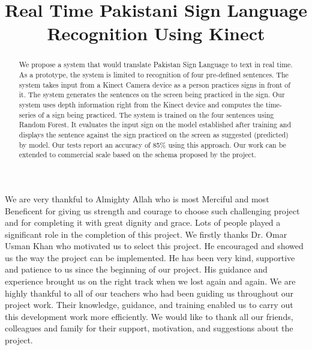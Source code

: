 \documentclass{fast-nuces-bs}
\title{Real Time Pakistani Sign Language
	Recognition Using Kinect}
\begin{document}
\begin{acknowledgements}
	We are very thankful to Almighty Allah who is most Merciful and most Beneficent for
	giving us strength and courage to choose such challenging project and for completing it
	with great dignity and grace. Lots of people played a significant role in the completion of
	this project.
	We firstly thanks Dr. Omar Usman Khan who motivated us to select this project. He
	encouraged and showed us the way the project can be implemented. He has been very
	kind, supportive and patience to us since the beginning of our project. His guidance and
	experience brought us on the right track when we lost again and again.
	We are highly thankful to all of our teachers who had been guiding us throughout our
	project work. Their knowledge, guidance, and training enabled us to carry out this development work more efficiently. We would like to thank all our friends, colleagues and
	family for their support, motivation, and suggestions about the project.
\end{acknowledgements}

\begin{abstract}
We propose a system that would translate Pakistan Sign Language to text in real time.
As a prototype, the system is limited to recognition of four pre-defined sentences. The system takes
input from a Kinect Camera device as a person practices signs in front of it. The system
generates the sentences on the screen being practiced in the sign. Our 
system uses depth information right from the Kinect device and computes the time-series
of a sign being practiced. The system is trained on the four sentences using Random Forest. It  evaluates the input sign on the model established after training and displays the sentence
against the sign practiced on the screen as suggested (predicted) by model. Our tests report an accuracy of 85\% using this approach. Our work can
be extended to commercial scale based on the schema proposed by the project.
\end{abstract}









\appendix




 
\end{document}
